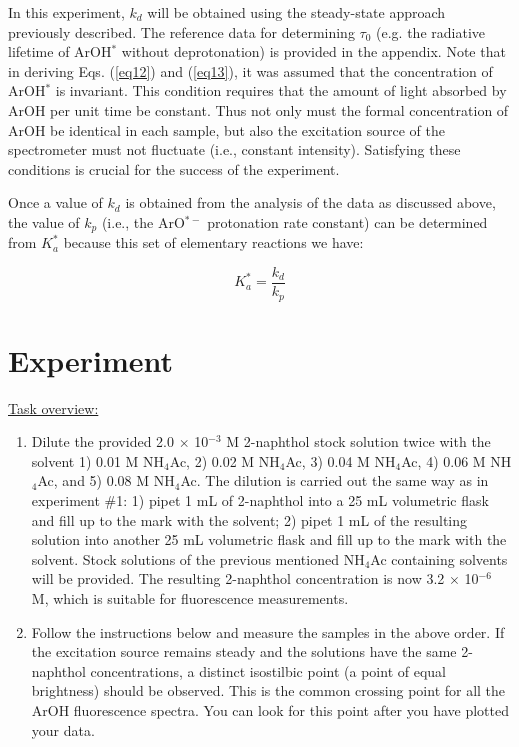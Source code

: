 \documentclass[byrevtex,amssymb,aps,pra,floatfix,letterpaper]{revtex4}
\begin{document}
In this experiment, $k_d$ will be obtained using the steady-state approach previously described. The reference data for determining $\tau_0$ (e.g. the radiative lifetime of ArOH$^*$ without deprotonation) is provided in the appendix. Note that in deriving Eqs. (\ref{eq12}) and (\ref{eq13}), it was assumed that the concentration of ArOH$^*$ is invariant. This condition requires that the amount of light absorbed by ArOH per unit time be constant. Thus not only must the formal concentration of ArOH be identical in each sample, but also the excitation source of the spectrometer must not fluctuate (i.e., constant intensity). Satisfying these conditions is crucial for the success of the experiment.

Once a value of $k_d$ is obtained from the analysis of the data as discussed above, the value of $k_p$ (i.e., the ArO$^{*-}$ protonation rate constant) can be determined from $K_a^*$ because this set of elementary reactions we have:

\begin{equation}
K_a^* = \frac{k_d}{k_p}
\label{eq16}
\end{equation}

\section{Experiment}

\noindent
\underline{Task overview:}\\

\begin{enumerate}
\item Dilute the provided 2.0 $\times$ 10$^{-3}$ M 2-naphthol stock solution twice with the solvent 1) 0.01 M NH$_4$Ac, 2) 0.02 M NH$_4$Ac, 3) 0.04 M NH$_4$Ac, 4) 0.06 M NH$_4$Ac, and 5) 0.08 M NH$_4$Ac. The dilution is carried out the same way as in experiment \#1: 1) pipet 1 mL of 2-naphthol into a 25 mL volumetric flask and fill up to the mark with the solvent; 2) pipet 1 mL of the resulting solution into another 25 mL volumetric flask and fill up to the mark with the solvent. Stock solutions of the previous mentioned NH$_4$Ac containing solvents will be provided. The resulting 2-naphthol concentration is now 3.2 $\times$ 10$^{-6}$ M, which is suitable for fluorescence measurements.

\item Follow the instructions below and measure the samples in the above order. If the excitation source remains steady and the solutions have the same 2-naphthol concentrations, a distinct isostilbic point (a point of equal brightness) should be observed. This is the common crossing point for all the ArOH fluorescence spectra. You can look for this point after you have plotted your data.

\end{enumerate}
\end{document}
